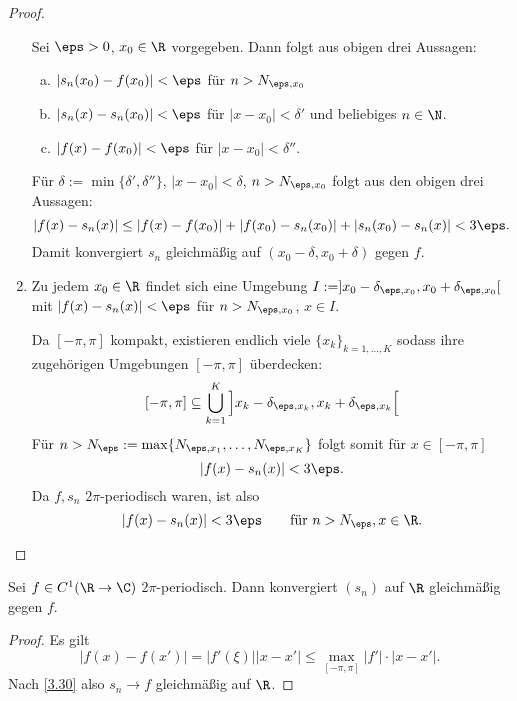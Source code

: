 \begin{st}
\begin{proof}
\begin{enumerate}[1)]
				Sei $\eps > 0$, $x_0 \in \R$ vorgegeben.
				Dann folgt aus obigen drei Aussagen:
				\begin{enumerate}[a)]
					\item
						$|s_n(x_0) - f(x_0)| < \eps$ für $n > N_{\eps, x_0}$
					\item
						$|s_n(x) - s_n(x_0)| < \eps$ für $|x-x_0| < \delta'$ und beliebiges $n\in \N$.
					\item
						$|f(x) - f(x_0)| < \eps$ für $|x-x_0| < \delta''$.
				\end{enumerate}
				Für $\delta := \min\{\delta', \delta''\}$, $|x-x_0| < \delta$, $n > N_{\eps, x_0}$ folgt aus den obigen drei Aussagen:
				\[
					|f(x) - s_n(x)|
					\le |f(x) - f(x_0)| + |f(x_0)-s_n(x_0)| + |s_n(x_0) - s_n(x)|
					< 3\eps.
				\]
				Damit konvergiert $s_n$ gleichmäßig auf $(x_0-\delta, x_0+\delta)$ gegen $f$.
			\item
				Zu jedem $x_0 \in \R$ findet sich eine Umgebung $I := ]x_0-\delta_{\eps, x_0}, x_0 + \delta_{\eps, x_0}[$ mit $|f(x) - s_n(x)| < \eps$ für $n > N_{\eps, x_0}$, $x \in  I$.

				Da $[-\pi,\pi]$ kompakt, existieren endlich viele $\{x_k\}_{k=1,\dotsc,K}$ sodass ihre zugehörigen Umgebungen $[-\pi, \pi]$ überdecken:
				\[
					[-\pi,\pi] \subset \bigcup_{k=1}^K \Big] x_k - \delta_{\eps, x_k}, x_k + \delta_{\eps, x_k} \Big[
				\]
				Für $n > N_\eps := \max\{N_{\eps, x_1}, \dotsc, N_{\eps, x_K}\}$ folgt somit für $x \in [-\pi,\pi]$
				\[
					|f(x) - s_n(x)| < 3\eps.
				\]
				Da $f, s_n$ $2\pi$-periodisch waren, ist also
				\[
					|f(x) - s_n(x)| < 3\eps \qquad \text{für $n> N_\eps, x\in \R$.}
				\]
		\end{enumerate}
	\end{proof}
\end{st}

\begin{kor} \label{3.31}
	Sei $f \in C^1(\R \to \C)$ $2\pi$-periodisch.
	Dann konvergiert $(s_n)$ auf $\R$ gleichmäßig gegen $f$.
	\begin{proof}
		Es gilt
		\[
			|f(x) - f(x')| = |f'(\xi)||x-x'| \le \max_{[-\pi,\pi]} |f'|\cdot |x-x'|.
		\]
		Nach \ref{3.30} also $s_n \to f$ gleichmäßig auf $\R$.
	\end{proof}
\end{kor}

